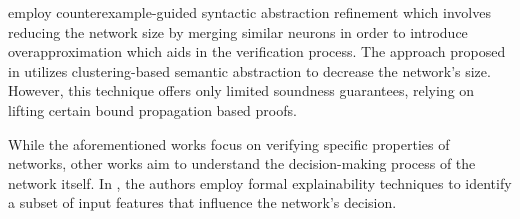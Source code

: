  employ counterexample-guided syntactic abstraction refinement  
which involves reducing the network size by merging similar neurons
in order to introduce overapproximation which aids in the verification process.
The approach proposed in  utilizes clustering-based 
semantic abstraction to decrease the network's size. However, this technique 
offers only limited soundness guarantees, relying on lifting certain bound propagation
based proofs.

While the aforementioned works focus on verifying specific properties of 
networks, other works aim to understand the decision-making process of the network 
itself.  In , the authors employ formal
explainability techniques to identify a subset of input features that 
influence the network's decision.


